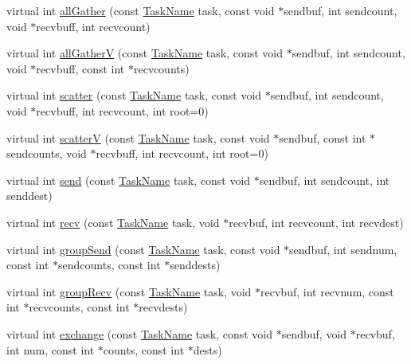 \begin{DoxyCompactItemize}
\item 
virtual int \hyperlink{classHSF_1_1Communicator_a1d5b58afa61131c24cf2c193a1959d35}{allGather} (const \hyperlink{namespaceHSF_a928eb958edfcd09f62de19e9cd3bac70}{TaskName} task, const void $\ast$sendbuf, int sendcount, void $\ast$recvbuff, int recvcount)
\item 
virtual int \hyperlink{classHSF_1_1Communicator_a4c1230db745ac434c7ccf883ec385ac0}{allGatherV} (const \hyperlink{namespaceHSF_a928eb958edfcd09f62de19e9cd3bac70}{TaskName} task, const void $\ast$sendbuf, int sendcount, void $\ast$recvbuff, const int $\ast$recvcounts)
\item 
virtual int \hyperlink{classHSF_1_1Communicator_ad7b0160f042fe3574068ca4ffd344fbd}{scatter} (const \hyperlink{namespaceHSF_a928eb958edfcd09f62de19e9cd3bac70}{TaskName} task, const void $\ast$sendbuf, int sendcount, void $\ast$recvbuff, int recvcount, int root=0)
\item 
virtual int \hyperlink{classHSF_1_1Communicator_ad9f7ec0244f1400f0ab12da93d4d7692}{scatterV} (const \hyperlink{namespaceHSF_a928eb958edfcd09f62de19e9cd3bac70}{TaskName} task, const void $\ast$sendbuf, const int $\ast$sendcounts, void $\ast$recvbuff, int recvcount, int root=0)
\item 
virtual int \hyperlink{classHSF_1_1Communicator_a29a10dcfc67e9256334db3afd37b8110}{send} (const \hyperlink{namespaceHSF_a928eb958edfcd09f62de19e9cd3bac70}{TaskName} task, const void $\ast$sendbuf, int sendcount, int senddest)
\item 
virtual int \hyperlink{classHSF_1_1Communicator_a5eef2313efb2d5ef60a8cad80262c16a}{recv} (const \hyperlink{namespaceHSF_a928eb958edfcd09f62de19e9cd3bac70}{TaskName} task, void $\ast$recvbuf, int recvcount, int recvdest)
\item 
virtual int \hyperlink{classHSF_1_1Communicator_ade12846093265c30681b1c8e79766ce2}{groupSend} (const \hyperlink{namespaceHSF_a928eb958edfcd09f62de19e9cd3bac70}{TaskName} task, const void $\ast$sendbuf, int sendnum, const int $\ast$sendcounts, const int $\ast$senddests)
\item 
virtual int \hyperlink{classHSF_1_1Communicator_a6735f3712db25e66402f1f6ea95e51ac}{groupRecv} (const \hyperlink{namespaceHSF_a928eb958edfcd09f62de19e9cd3bac70}{TaskName} task, void $\ast$recvbuf, int recvnum, const int $\ast$recvcounts, const int $\ast$recvdests)
\item 
virtual int \hyperlink{classHSF_1_1Communicator_a9459ed3c5350a046e5ab91ae329e650b}{exchange} (const \hyperlink{namespaceHSF_a928eb958edfcd09f62de19e9cd3bac70}{TaskName} task, const void $\ast$sendbuf, void $\ast$recvbuf, int num, const int $\ast$counts, const int $\ast$dests)

\end{DoxyCompactItemize}

